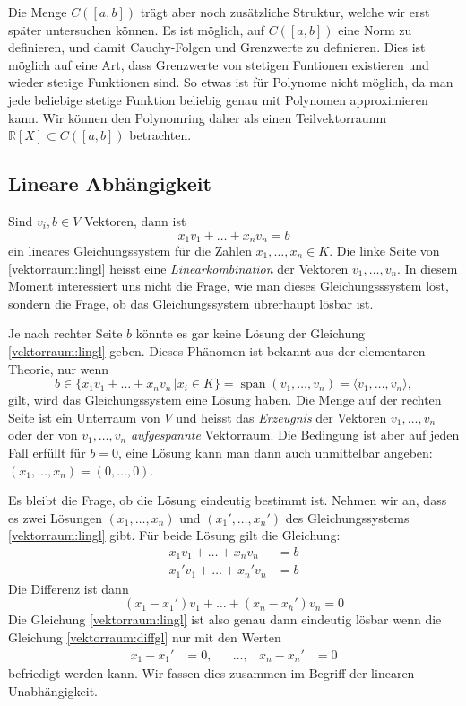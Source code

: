 Die Menge $C([a,b])$ trägt aber noch zusätzliche Struktur, welche
wir erst später untersuchen können.
Es ist möglich, auf $C([a,b])$ eine Norm zu definieren, und damit
Cauchy-Folgen und Grenzwerte zu definieren.
Dies ist möglich auf eine Art, dass Grenzwerte von stetigen Funtionen
existieren und wieder stetige Funktionen sind.
So etwas ist für Polynome nicht möglich, da man jede beliebige stetige
Funktion beliebig genau mit Polynomen approximieren kann.
Wir können den Polynomring daher als einen Teilvektorraunm
$\mathbb R[X]\subset C([a,b])$ betrachten.

\subsection{Lineare Abhängigkeit}
Sind $v_i,b\in V$ Vektoren, dann ist
\begin{equation}
x_1 v_1 + \dots + x_n v_n = b
\label{vektorraum:lingl}
\end{equation}
ein lineares Gleichungssystem für die Zahlen $x_1,\dots,x_n\in K$.
Die linke Seite von \eqref{vektorraum:lingl} heisst eine
{\em Linearkombination} der Vektoren $v_1,\dots,v_n$.
In diesem Moment interessiert uns nicht die Frage, wie man dieses
Gleichungsssystem löst, sondern die Frage, ob das Gleichungssystem
übrerhaupt lösbar ist.

Je nach rechter Seite $b$ könnte es gar keine Lösung der Gleichung
\eqref{vektorraum:lingl} geben.
Dieses Phänomen ist bekannt aus der elementaren Theorie, nur wenn
\[
b\in \{ x_1v_1+\dots+ x_nv_n\,|x_i\in K\}
=
\operatorname{span}(v_1,\dots,v_n)
=
\langle v_1,\dots,v_n\rangle,
\]
gilt, wird das Gleichungssystem eine Lösung haben.
Die Menge auf der rechten Seite ist ein Unterraum von $V$ und
heisst das {\em Erzeugnis} der Vektoren $v_1,\dots,v_n$ oder
%
der von $v_1,\dots,v_n$ {\em aufgespannte} Vektorraum.
%
Die Bedingung ist aber auf jeden Fall erfüllt für $b=0$, 
eine Lösung kann man dann auch unmittelbar angeben:
$(x_1,\dots,x_n)=(0,\dots,0)$.

Es bleibt die Frage, ob die Lösung eindeutig bestimmt ist.
Nehmen wir an, dass es zwei Lösungen $(x_1,\dots,x_n)$ und
$(x_1',\dots,x_n')$ des Gleichungssystems \eqref{vektorraum:lingl}
gibt.
Für beide Lösung gilt die Gleichung:
\begin{align*}
x_1v_1+\dots+x_nv_n&=b\\
x_1'v_1+\dots+x_n'v_n&=b
\end{align*}
Die Differenz ist dann
\begin{equation}
(x_1-x_1')v_1+\dots + (x_n-x_h') v_n = 0
\label{vektorraum:diffgl}
\end{equation}
Die Gleichung
\eqref{vektorraum:lingl} ist also genau dann eindeutig lösbar
wenn die Gleichung \eqref{vektorraum:diffgl} nur mit den Werten
\[
\begin{aligned}
x_1-x_1'&=0,&&\dots,&
x_n-x_n'&=0
\end{aligned}
\]
befriedigt werden kann.
Wir fassen dies zusammen im Begriff der linearen Unabhängigkeit.

